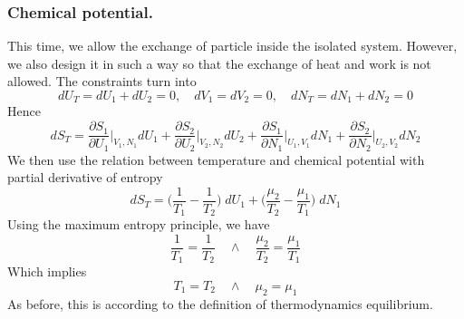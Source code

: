 \documentclass[../../../Main.tex]{subfiles}
\begin{document}
\subsubsection{Chemical potential.} This time, we allow the exchange of particle inside the isolated system. However, we also design it in such a way so that the exchange of heat and work is not allowed. The constraints turn into 
\begin{equation*}
    dU_T=dU_1+dU_2=0, \quad dV_1 =dV_2=0, \quad dN_T=dN_1+dN_2=0
\end{equation*}
Hence 
\begin{equation*}
    dS_T=\frac{\partial S_1}{\partial U_1}\bigg|_{V_1,N_1} dU_1 + \frac{\partial S_2}{\partial U_2}\bigg|_{V_2,N_2} dU_2  +
    \frac{\partial S_1}{\partial N_1}\bigg|_{U_1,V_1} dN_1 + \frac{\partial S_2}{\partial N_2}\bigg|_{U_2,V_2} dN_2
\end{equation*}
We then use the relation between temperature and chemical potential with partial derivative of entropy
\begin{equation*}
    dS_T=\biggl(\frac{1}{T_1}-\frac{1}{T_2}\biggr)\;dU_1+\biggl(\frac{\mu_2}{T_2}-\frac{\mu_1}{T_1}\biggr)\;dN_1
\end{equation*}
Using the maximum entropy principle, we have 
\begin{equation*}
    \frac{1}{T_1}=\frac{1 }{T_2}
    \quad\land\quad
    \frac{\mu_2}{T_2}=\frac{\mu_1}{T_1}
\end{equation*}
Which implies
\begin{equation*}
    T_1=T_2
    \quad\land\quad
    \mu_2=\mu_1
\end{equation*}
As before, this is according to the definition of thermodynamics equilibrium.
\end{document}
